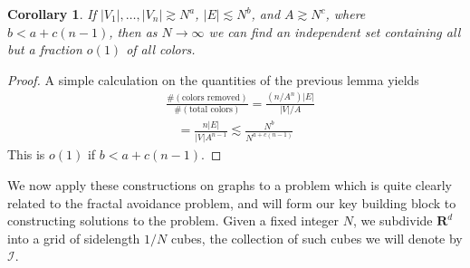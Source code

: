 \documentclass{article}
\theoremstyle{plain}
\newtheorem*{corollary}{Corollary}
\theoremstyle{plain}
\begin{document}
\begin{multicols}{2}
\begin{corollary}
	If $|V_1|, \dots, |V_n| \gtrsim N^a$, $|E| \lesssim N^b$, and $A \gtrsim N^c$, where $b < a + c(n-1)$, then as $N \to \infty$ we can find an independent set containing all but a fraction $o(1)$ of all colors.
\end{corollary}
\begin{proof}
	A simple calculation on the quantities of the previous lemma yields
	\begin{align*}
		&\frac{\# ( \text{colors removed} )}{\# ( \text{total colors} )} = \frac{(n/A^n)|E|}{|V|/A}\\
		&\ \ \ \ = \frac{n|E|}{|V|A^{n-1}} \lesssim \frac{N^b}{N^{a + c(n-1)}}
	\end{align*}
	This is $o(1)$ if $b < a + c(n-1)$.
\end{proof}

We now apply these constructions on graphs to a problem which is quite clearly related to the fractal avoidance problem, and will form our key building block to constructing solutions to the problem. Given a fixed integer $N$, we subdivide $\mathbf{R}^d$ into a grid of sidelength $1/N$ cubes, the collection of such cubes we will denote by $\mathcal{I}$.


\end{multicols}
\end{document}
